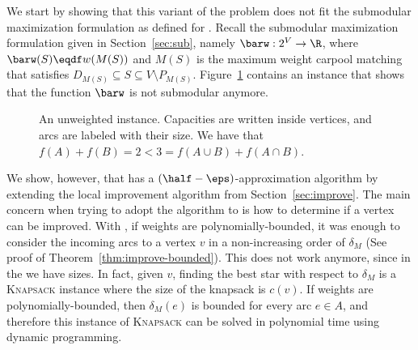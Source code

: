 We start by showing that this variant of the problem does not fit the
submodular maximization formulation as defined for \carpool.
%
Recall the submodular maximization formulation given in
Section~\ref{sec:sub}, namely $\barw: 2^V \to \R$, where
$\barw(S) \eqdf w(M(S))$ and $M(S)$ is the maximum weight carpool
matching that satisfies $D_{M(S)} \subseteq S \subseteq V \setminus
P_{M(S)}$.
%
Figure~\ref{fig:not submodular} contains an instance that shows that
the function $\barw$ is not submodular anymore.

\begin{figure}
\begin{center}
\end{center}
\caption[Group Carpool - Not Submodular]{An unweighted \carpool instance.  Capacities are written
  inside vertices, and arcs are labeled with their size.  We have that
  $f(A) + f(B) = 2 < 3 = f(A \cup B) + f(A \cap B)$.}
\label{fig:not submodular}
\end{figure}

We show, however, that \gcp has a $(\half -\eps)$-approximation
algorithm by extending the local improvement algorithm from
Section~\ref{sec:improve}.
%
The main concern when trying to adopt the algorithm to \gcp is how to
determine if a vertex can be improved.
%
With \carpool, if weights are polynomially-bounded, it was enough to
consider the incoming arcs to a vertex $v$ in a non-increasing
order of $\delta_M$ (See proof of Theorem~\ref{thm:improve-bounded}).
This does not work anymore, since in the \gcp we have sizes.  In fact, given
$v$, finding the best star with respect to $\delta_M$ is
a \textsc{Knapsack} instance where the size of the knapsack is $c(v)$.
%
If weights are polynomially-bounded, then $\delta_M(e)$ is bounded for
every arc $e \in A$, and therefore this instance of \textsc{Knapsack}
can be solved in polynomial time using dynamic programming.

